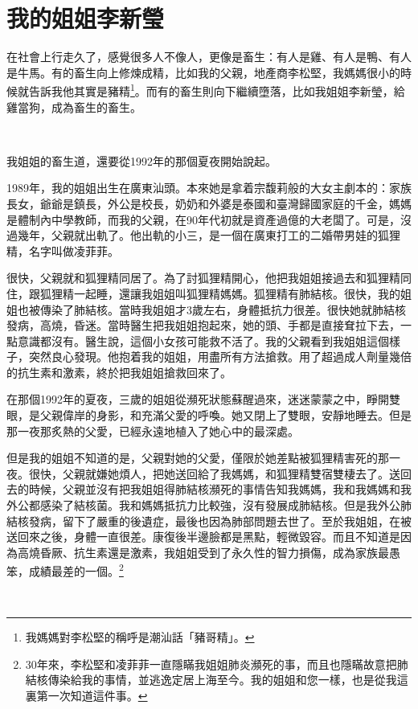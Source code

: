 \newpage

\section{我的姐姐李新瑩}
\label{sister}

在社會上行走久了，感覺很多人不像人，更像是畜生：有人是雞、有人是鴨、有人是牛馬。有的畜生向上修煉成精，比如我的父親，地產商李松堅，我媽媽很小的時候就告訴我他其實是豬精\footnote{我媽媽對李松堅的稱呼是潮汕話「豬哥精」。}。而有的畜生則向下繼續墮落，比如我姐姐李新瑩，給雞當狗，成為畜生的畜生。

\ 

我姐姐的畜生道，還要從1992年的那個夏夜開始說起。

1989年，我的姐姐出生在廣東汕頭。本來她是拿着宗馥莉般的大女主劇本的：家族長女，爺爺是鎮長，外公是校長，奶奶和外婆是泰國和臺灣歸國家庭的千金，媽媽是體制內中學教師，而我的父親，在90年代初就是資產過億的大老闆了。可是，沒過幾年，父親就出軌了。他出軌的小三，是一個在廣東打工的二婚帶男娃的狐狸精，名字叫做凌菲菲。

很快，父親就和狐狸精同居了。為了討狐狸精開心，他把我姐姐接過去和狐狸精同住，跟狐狸精一起睡，還讓我姐姐叫狐狸精媽媽。狐狸精有肺結核。很快，我的姐姐也被傳染了肺結核。當時我姐姐才3歲左右，身體抵抗力很差。很快她就肺結核發病，高燒，昏迷。當時醫生把我姐姐抱起來，她的頭、手都是直接耷拉下去，一點意識都沒有。醫生說，這個小女孩可能救不活了。我的父親看到我姐姐這個樣子，突然良心發現。他抱着我的姐姐，用盡所有方法搶救。用了超過成人劑量幾倍的抗生素和激素，終於把我姐姐搶救回來了。

在那個1992年的夏夜，三歲的姐姐從瀕死狀態蘇醒過來，迷迷蒙蒙之中，睜開雙眼，是父親偉岸的身影，和充滿父愛的呼喚。她又閉上了雙眼，安靜地睡去。但是那一夜那炙熱的父愛，已經永遠地植入了她心中的最深處。

但是我的姐姐不知道的是，父親對她的父愛，僅限於她差點被狐狸精害死的那一夜。很快，父親就嫌她煩人，把她送回給了我媽媽，和狐狸精雙宿雙棲去了。送回去的時候，父親並沒有把我姐姐得肺結核瀕死的事情告知我媽媽，我和我媽媽和我外公都感染了結核菌。我和媽媽抵抗力比較強，沒有發展成肺結核。但是我外公肺結核發病，留下了嚴重的後遺症，最後也因為肺部問題去世了。至於我姐姐，在被送回來之後，身體一直很差。康復後半邊臉都是黑點，輕微毀容。而且不知道是因為高燒昏厥、抗生素還是激素，我姐姐受到了永久性的智力損傷，成為家族最愚笨，成績最差的一個。\footnote{30年來，李松堅和凌菲菲一直隱瞞我姐姐肺炎瀕死的事，而且也隱瞞故意把肺結核傳染給我的事情，並逃逸定居上海至今。我的姐姐和您一樣，也是從我這裏第一次知道這件事。}

\ 

